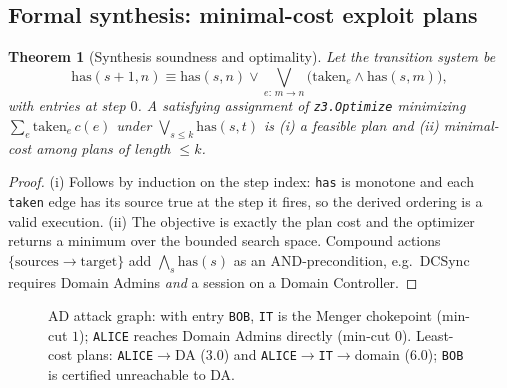 \documentclass[journal]{IEEEtran}
\newtheorem{theorem}{Theorem}
\begin{document}
\subsection{Formal synthesis: minimal-cost exploit plans}
\begin{theorem}[Synthesis soundness and optimality]
\label{thm:synth}
Let the transition system be
\[
\mathrm{has}(s{+}1,n)\equiv \mathrm{has}(s,n)
\vee \bigvee_{e:\,m\to n}\bigl(\mathrm{taken}_e\wedge\mathrm{has}(s,m)\bigr),
\]
with entries at step $0$. A satisfying assignment of
\texttt{z3.Optimize} \cite{z3} minimizing $\sum_e \mathrm{taken}_e\,c(e)$ under
$\bigvee_{s\le k}\mathrm{has}(s,t)$ is (i) a feasible plan and (ii) minimal-cost
among plans of length $\le k$.
\end{theorem}
\begin{proof}
(i) Follows by induction on the step index: \texttt{has} is monotone and each
\texttt{taken} edge has its source true at the step it fires, so the derived
ordering is a valid execution. (ii) The objective is exactly the plan cost and the
optimizer returns a minimum over the bounded search space. Compound actions
$\{\mathrm{sources}\to \mathrm{target}\}$ add $\bigwedge_{s}\mathrm{has}(s)$ as an
AND-precondition, e.g.\ DCSync requires Domain Admins \emph{and} a session on a
Domain Controller. \qedhere
\end{proof}

\begin{figure}[!t]
\centering
{}
\caption{AD attack graph: with entry \texttt{BOB}, \texttt{IT} is the Menger
chokepoint (min-cut $1$); \texttt{ALICE} reaches Domain Admins directly (min-cut
$0$). Least-cost plans: \texttt{ALICE}$\to$DA ($3.0$) and
\texttt{ALICE}$\to$\texttt{IT}$\to$domain ($6.0$); \texttt{BOB} is certified
unreachable to DA.}
\label{fig:attackgraph}
\end{figure}
\end{document}
